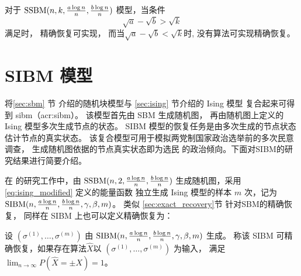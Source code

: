 \begin{theorem}\label{thm:sbmk_phase_transition}
  对于 $\operatorname{SSBM}(n,k,\frac{a \log n}{n}, \frac{b \log n}{n})$ 模型，当条件
  \begin{equation}\label{eq:abk}
    \sqrt{a} - \sqrt{b} > \sqrt{k}
  \end{equation}   
  满足时，
  精确恢复可实现，
  而当$\sqrt{a} - \sqrt{b} < \sqrt{k}$时,
  没有算法可实现精确恢复。
\end{theorem}
\section{SIBM 模型}\label{sec:sibm_model}
将\ref{sec:sbm} 节 介绍的随机块模型与 \ref{sec:ising} 节介绍的 Ising 模型
复合起来可得到 \gls{sibm}（\gls{acr:sibm}）\cite{ye2020exact}。
该模型首先由 SBM 生成随机图，
再由随机图上定义的 Ising 模型多次生成节点的状态。
SIBM 模型的恢复任务是由多次生成的节点状态估计节点的真实状态。
该复合模型可用于模拟两党制国家政治选举前的多次民意调查，
生成随机图依据的节点真实状态即为选民
的政治倾向。下面对SIBM的研究结果进行简要介绍。

在\citet{ye2020exact} 的研究工作中，由 $\operatorname{SSBM}(n,2,\frac{a \log n}{n}, \frac{b \log n}{n})$
生成随机图，采用 \eqref{eq:ising_modified} 定义的能量函数
独立生成 Ising 模型的样本 $m$ 次，记为
$\operatorname{SIBM}(n, \frac{a \log n}{n}, \frac{b \log n}{n}, \gamma, \beta, m)$。
类似 \ref{sec:exact_recovery}节
针对SBM的精确恢复，
同样在 SIBM 上也可以定义精确恢复为：
\begin{definition}\label{def:sibm_exact_recovery}
  设 $(\sigma^{(1)}, \dots, \sigma^{(m)})$
  由 $\operatorname{SIBM}(n, \frac{a \log n}{n}, \frac{b \log n}{n}, \gamma, \beta, m)$ 生成。
  称该 SIBM 可精确恢复，如果存在算法$\hat{X}$以
  $(\sigma^{(1)}, \dots, \sigma^{(m)})$ 为输入，
  满足 $\lim_{n\to \infty}P(\hat{X}=\pm X) = 1$。 
\end{definition}


